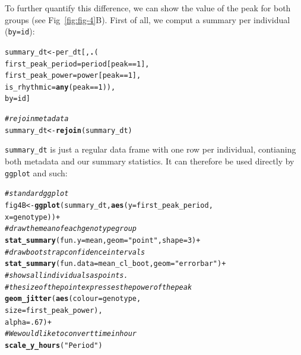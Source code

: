 \documentclass[10pt,letterpaper]{article}\usepackage[]{graphicx}\usepackage[]{color}
\makeatletter
\newcommand{\hlnum}[1]{\textcolor[rgb]{0.686,0.059,0.569}{#1}}%
\newcommand{\hlstr}[1]{\textcolor[rgb]{0.192,0.494,0.8}{#1}}%
\newcommand{\hlcom}[1]{\textcolor[rgb]{0.678,0.584,0.686}{\textit{#1}}}%
\newcommand{\hlopt}[1]{\textcolor[rgb]{0,0,0}{#1}}%
\newcommand{\hlstd}[1]{\textcolor[rgb]{0.345,0.345,0.345}{#1}}%
\newcommand{\hlkwb}[1]{\textcolor[rgb]{0.69,0.353,0.396}{#1}}%
\newcommand{\hlkwc}[1]{\textcolor[rgb]{0.333,0.667,0.333}{#1}}%
\newcommand{\hlkwd}[1]{\textcolor[rgb]{0.737,0.353,0.396}{\textbf{#1}}}%
\newenvironment{kframe}{%
 \def\at@end@of@kframe{}%
 \ifinner\ifhmode%
  \def\at@end@of@kframe{\end{minipage}}%
  \begin{minipage}{\columnwidth}%
 \fi\fi%
 \def\FrameCommand##1{\hskip\@totalleftmargin \hskip-\fboxsep
 \colorbox{shadecolor}{##1}\hskip-\fboxsep
     \hskip-\linewidth \hskip-\@totalleftmargin \hskip\columnwidth}%
 \MakeFramed {\advance\hsize-\width
   \@totalleftmargin\z@ \linewidth\hsize
   \@setminipage}}%
 {\par\unskip\endMakeFramed%
 \at@end@of@kframe}
\newenvironment{knitrout}{}{} %
\makeatother
\begin{document}
To further quantify this difference, we can show the value of the peak for both groups (see Fig~\ref{fig:fig-4}B). First of all, we comput a summary per individual (\texttt{by=id}):

\begin{knitrout}
\color{fgcolor}\begin{kframe}
\begin{alltt}
\hlstd{summary_dt} \hlkwb{<-} \hlstd{per_dt[,}\hlkwd{.}\hlstd{(}
                        \hlkwc{first_peak_period} \hlstd{= period[peak}\hlopt{==}\hlnum{1}\hlstd{],}
                        \hlkwc{first_peak_power} \hlstd{= power[peak}\hlopt{==}\hlnum{1}\hlstd{],}
                        \hlkwc{is_rhythmic} \hlstd{=} \hlkwd{any}\hlstd{(peak}\hlopt{==}\hlnum{1}\hlstd{)),}
                      \hlkwc{by}\hlstd{=id]}


\hlcom{# rejoin metadata}
\hlstd{summary_dt} \hlkwb{<-} \hlkwd{rejoin}\hlstd{(summary_dt)}
\end{alltt}
\end{kframe}
\end{knitrout}

\texttt{summary\_dt} is just a regular data frame with one row per individual, contianing both metadata and our summary statistics. It can therefore be used directly by \texttt{ggplot} and such:

\begin{knitrout}
\color{fgcolor}\begin{kframe}
\begin{alltt}
\hlcom{# standard ggplot}
\hlstd{fig4B} \hlkwb{<-} \hlkwd{ggplot}\hlstd{(summary_dt,} \hlkwd{aes}\hlstd{(}\hlkwc{y} \hlstd{= first_peak_period,}
                                \hlkwc{x} \hlstd{= genotype))} \hlopt{+}
              \hlcom{# draw the mean of each genotype group}
              \hlkwd{stat_summary}\hlstd{(}\hlkwc{fun.y} \hlstd{= mean,} \hlkwc{geom} \hlstd{=} \hlstr{"point"}\hlstd{,} \hlkwc{shape}\hlstd{=}\hlnum{3}\hlstd{)} \hlopt{+}
              \hlcom{# draw bootstrap confidence intervals}
              \hlkwd{stat_summary}\hlstd{(}\hlkwc{fun.data} \hlstd{= mean_cl_boot,} \hlkwc{geom} \hlstd{=} \hlstr{"errorbar"}\hlstd{)} \hlopt{+}
              \hlcom{# shows all individuals as points. }
              \hlcom{# the size of the point expresses the power of the peak}
              \hlkwd{geom_jitter}\hlstd{(}\hlkwd{aes}\hlstd{(}\hlkwc{colour}\hlstd{= genotype,}
                              \hlkwc{size}\hlstd{=first_peak_power),}
                          \hlkwc{alpha}\hlstd{=}\hlnum{.67}\hlstd{)} \hlopt{+}
              \hlcom{# We would like to convert time in hour}
              \hlkwd{scale_y_hours}\hlstd{(}\hlstr{"Period"}\hlstd{)}
\end{alltt}
\end{kframe}
\end{knitrout}
\end{document}
